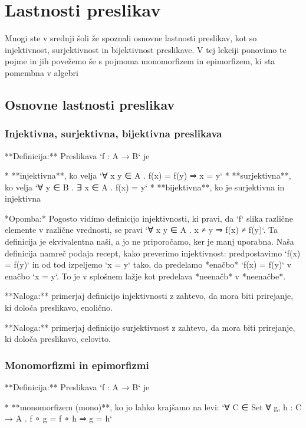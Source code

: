 \chapter{Lastnosti preslikav}

Mnogi ste v srednji šoli že spoznali osnovne lastnosti preslikav, kot so injektivnost, surjektivnost in bijektivnost
preslikave. V tej lekciji ponovimo te pojme in jih povežemo še s pojmoma monomorfizem in epimorfizem, ki sta pomembna v
algebri

\section{Osnovne lastnosti preslikav}

\subsection{Injektivna, surjektivna, bijektivna preslikava}

**Definicija:** Preslikava `f : A → B` je

* **injektivna**, ko velja `∀ x y ∈ A . f(x) = f(y) ⇒ x = y`
* **surjektivna**, ko velja `∀ y ∈ B . ∃ x ∈ A . f(x) = y`
* **bijektivna**, ko je surjektivna in injektivna

*Opomba:* Pogosto vidimo definicijo injektivnosti, ki pravi, da `f` slika različne elemente v različne vrednosti, se
pravi `∀ x y ∈ A . x ≠ y ⇒ f(x) ≠ f(y)`. Ta definicija je ekvivalentna naši, a jo ne priporočamo, ker je manj uporabna.
Naša definicija namreč podaja recept, kako preverimo injektivnost: predpostavimo `f(x) = f(y)` in od tod izpeljemo
`x = y` tako, da predelamo *enačbo* `f(x) = f(y)` v enačbo `x = y`. To je v splošnem lažje kot predelava *neenačb* v
*neenačbe*.

**Naloga:** primerjaj definicijo injektivnosti z zahtevo, da mora biti prirejanje, ki določa preslikavo, enolično.

**Naloga:** primerjaj definicijo surjektivnost z zahtevo, da mora biti prirejanje, ki določa preslikavo, celovito.


\subsection{Monomorfizmi in epimorfizmi}

**Definicija:** Preslikava `f : A → B` je

* **monomorfizem (mono)**, ko jo lahko krajšamo na levi:
  `∀ C ∈ Set ∀ g, h : C → A . f ∘ g = f ∘ h ⇒ g = h`

